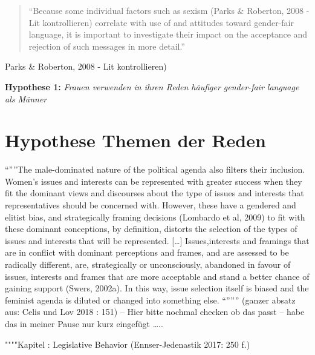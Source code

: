 \documentclass[12pt, 
    twoside=false, 
    bibliography=totoc, 
    numbers=endperiod, 
    headings=normal, 
    toc=chapterentrydotfill
    ]{scrbook}
\begin{document}
\begin{quote}
 \enquote {Because some individual factors such as sexism (Parks \& Roberton, 2008 - Lit kontrollieren) correlate with use of and attitudes toward gender-fair language, it is important to investigate their impact on the acceptance and rejection of such messages in more detail.} \parencite[556]{koeser_2014}
\end{quote} Parks \& Roberton, 2008 - Lit kontrollieren) 


\textbf{Hypothese 1:} \emph{Frauen verwenden in ihren Reden häufiger gender-fair language als Männer}



\section{Hypothese Themen der Reden}


“””The male-dominated nature of the political agenda also filters their inclusion. Women’s issues and interests can be represented with greater success when they fit the dominant views and discourses about the type of issues and interests that representatives should be concerned with. However, these have a gendered and elitist bias, and strategically framing decisions (Lombardo et al, 2009) to fit with these dominant conceptions, by definition, distorts the selection of the types of issues and interests that will be represented.  […]
Issues,interests and framings that are in conflict with dominant perceptions and frames, and are assessed to be radically different, are, strategically or unconsciously, abandoned in favour of issues, interests and frames that are more acceptable and stand a better chance of gaining support (Swers, 2002a). In this way, issue selection itself is biased and the feminist agenda is diluted or changed into something else. “””” \parencite[151]{celis_2018} (ganzer absatz aus: Celis und Lov 2018  : 151) – Hier bitte nochmal checken ob das passt – habe das in meiner Pause nur kurz eingefügt …..

""""Kapitel : Legislative Behavior (Ennser-Jedenastik 2017: 250 f.)
\end{document}
